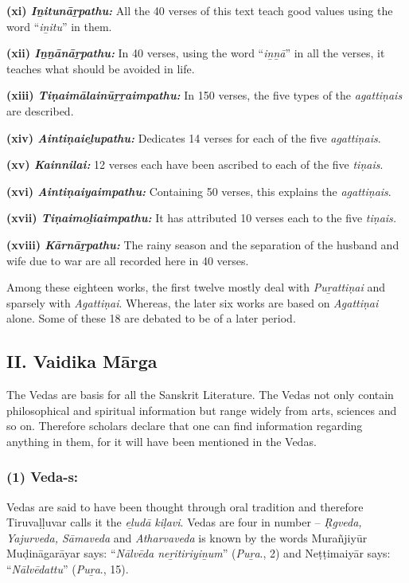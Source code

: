 \textbf{(xi) \textit{Iṉitunāṟpathu:}} All the 40 verses of this text teach good values using the word “\textit{iṉitu}” in them.

\textbf{(xii) \textit{Iṉṉānāṟpathu:}} In 40 verses, using the word “\textit{iṉṉā}” in all the verses, it teaches what should be avoided in life.

\textbf{(xiii) \textit{Tiṇaimālainūṟṟaimpathu:}} In 150 verses, the five types of the \textit{agattiṇais} are described.

\textbf{(xiv) \textit{Aintiṇaieḻupathu:}} Dedicates 14 verses for each of the five \textit{agattiṇais}.

\textbf{(xv) \textit{Kainnilai:}} 12 verses each have been ascribed to each of the five \textit{tiṇais}.

\textbf{(xvi) \textit{Aintiṇaiyaimpathu:}} Containing 50 verses, this explains the \textit{agattiṇais}.

\textbf{(xvii) \textit{Tiṇaimoḻiaimpathu:}} It has attributed 10 verses each to the five \textit{tiṇais.}

\textbf{(xviii) \textit{Kārnāṟpathu:}} The rainy season and the separation of the husband and wife due to war are all recorded here in 40 verses.

Among these eighteen works, the first twelve mostly deal with \textit{Puṟattiṇai} and sparsely with \textit{Agattiṇai}. Whereas, the later six works are based on \textit{Agattiṇai} alone. Some of these 18 are debated to be of a later period.


\subsection*{II. Vaidika Mārga}

\vskip -7pt

The Vedas are basis for all the Sanskrit Literature. The Vedas not only contain philosophical and spiritual information but range widely from arts, sciences and so on. Therefore scholars declare that one can find information regarding anything in them, for it will have been mentioned in the Vedas.

\subsubsection*{(1) Veda-s:}

\vskip -7pt

Vedas are said to have been thought through oral tradition and therefore Tiruvaḷḷuvar calls it the \textit{eḻudā kiḷavi}. Vedas are four in number – \textit{Ṛgveda, Yajurveda, Sāmaveda} and \textit{Atharvaveda} is known by the words Murañjiyūr Muḍināgarāyar says: “\textit{Nālvēda neṟitiriyiṉum}” (\textit{Puṟa}., 2) and Neṭṭimaiyār says: “\textit{Nālvēdattu}” (\textit{Puṟa}., 15).

